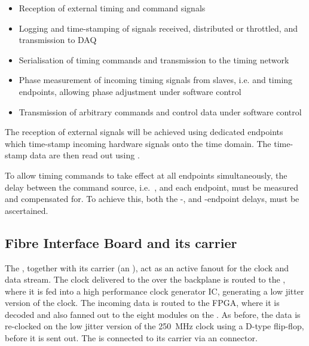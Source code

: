 \documentclass{dune}
\begin{document}
\begin{itemize}
	\item Reception of external timing and command signals
	\item Logging and time-stamping of signals received, distributed or throttled, and transmission to DAQ
	\item Serialisation of timing commands and transmission to the timing network
	\item Phase measurement of incoming timing signals from slaves, i.e.  and timing endpoints, allowing phase adjustment under software control
	\item Transmission of arbitrary commands and control data under software control
\end{itemize}

The reception of external signals will be achieved using dedicated endpoints which time-stamp incoming hardware signals onto the  time domain. The time-stamp data are then read out using . 


To allow timing commands to take effect at all endpoints simultaneously, the delay between the command source, i.e.\ , and each endpoint, must be measured and compensated for. To achieve this, both the -, and -endpoint delays, must be ascertained.

\subsection{Fibre Interface Board and its carrier}
The , together with its carrier (an ), act as an active fanout for the  clock and data stream. The clock delivered to the  over the  backplane is routed to the , where it is fed into a high performance clock generator IC, generating a low jitter version of the clock. The incoming data is routed to the  FPGA, where it is decoded and also fanned out to the eight  modules on the . As before, the  data is re-clocked on the low jitter version of the \SI{250}{\MHz} clock using a D-type flip-flop, before it is sent out. The  is connected to its  carrier via an  connector.
\end{document}
